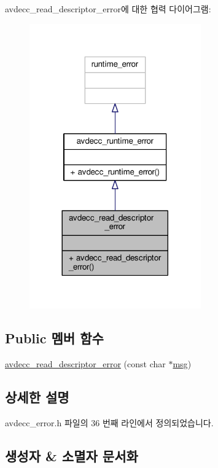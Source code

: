 avdecc\+\_\+read\+\_\+descriptor\+\_\+error에 대한 협력 다이어그램\+:
\nopagebreak
\begin{figure}[H]
\begin{center}
\leavevmode
\includegraphics[width=209pt]{classavdecc__lib_1_1avdecc__read__descriptor__error__coll__graph}
\end{center}
\end{figure}
\subsection*{Public 멤버 함수}
\begin{DoxyCompactItemize}
\item 
\hyperlink{classavdecc__lib_1_1avdecc__read__descriptor__error_a33a471f5c355ab3e41c1149c14c1b2d5}{avdecc\+\_\+read\+\_\+descriptor\+\_\+error} (const char $\ast$\hyperlink{openavb__log_8c_a0c7e58a50354c4a4d6dad428d0e47029}{msg})
\end{DoxyCompactItemize}


\subsection{상세한 설명}


avdecc\+\_\+error.\+h 파일의 36 번째 라인에서 정의되었습니다.



\subsection{생성자 \& 소멸자 문서화}
